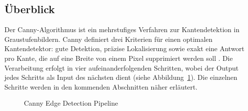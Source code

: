 \subsection{Überblick}
\label{subsec:uberblick}

Der Canny-Algorithmus ist ein mehrstufiges Verfahren zur Kantendetektion in
Graustufenbildern. Canny definiert drei Kriterien für einen optimalen
Kantendetektor: gute Detektion, präzise Lokalisierung sowie exakt eine
Antwort pro Kante, die auf eine Breite von einem Pixel supprimiert werden
soll \cite[S.~680]{canny1986}. Die Verarbeitung erfolgt in vier aufeinanderfolgenden
Schritten, wobei der Output jedes Schritts als Input des nächsten dient
(siehe Abbildung~\ref{fig:pipeline}). Die einzelnen Schritte werden in den
kommenden Abschnitten näher erläutert.

\begin{figure}[h]
    \centering
    \caption{Canny Edge Detection Pipeline}
    \label{fig:pipeline}
\end{figure}